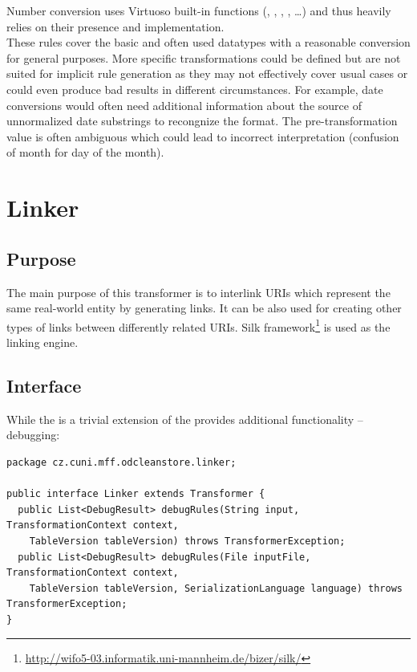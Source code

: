Number conversion uses Virtuoso built-in functions (, , , ,  \ldots) and thus heavily relies on their presence and implementation.
\\

These rules cover the basic and often used  datatypes with a reasonable conversion for general purposes. More specific transformations could be defined but are not suited for implicit rule generation as they may not effectively cover usual cases or could even produce bad results in different circumstances. For example, date conversions would often need additional information about the source of unnormalized date substrings to recongnize the format. The pre-transformation value is often ambiguous which could lead to incorrect interpretation (confusion of month for day of the month).

\section{Linker}

\subsection{Purpose}

The main purpose of this transformer is to interlink URIs which represent the same real-world entity by generating  links. It can be also used for creating other types of links between differently related URIs. Silk framework\footnote{\url{http://wifo5-03.informatik.uni-mannheim.de/bizer/silk/}} is used as the linking engine.

\subsection{Interface}

While the  is a trivial extension of  the  provides additional functionality -- debugging:

\begin{lstlisting}[caption=Linker interface,label=lst:linker]
package cz.cuni.mff.odcleanstore.linker;

public interface Linker extends Transformer {
  public List<DebugResult> debugRules(String input, TransformationContext context, 
    TableVersion tableVersion) throws TransformerException;
  public List<DebugResult> debugRules(File inputFile, TransformationContext context, 
    TableVersion tableVersion, SerializationLanguage language) throws TransformerException;
}
\end{lstlisting}

